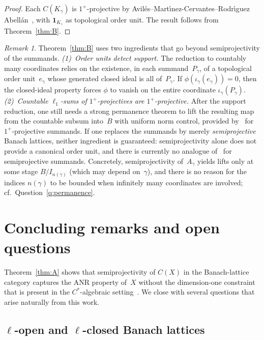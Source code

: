 \documentclass[11pt]{amsart}
\numberwithin{equation}{section}
\theoremstyle{definition}
\theoremstyle{remark}
\newtheorem{remark}[theorem]{Remark}
\theoremstyle{plain}
\begin{document}
\begin{proof}
Each $C(K_\gamma)$ is $1^+$-projective by
Avil\'es--Mart\'{\i}nez-Cervantes--Rodr\'{\i}guez Abell\'an~\cite[Theorem~1.4]{avilaes2020},
with $\mathbf{1}_{K_\gamma}$ as topological order unit.
The result follows from Theorem~\ref{thm:B}.
\end{proof}

\begin{remark}\label{rem:l1-sum-why-special}
Theorem~\ref{thm:B} uses two ingredients that go beyond semiprojectivity
of the summands.
\emph{(1)~Order units detect support.}
The reduction to countably many coordinates relies on the existence, in each summand~$P_\gamma$,
of a topological order unit~$e_\gamma$ whose generated closed ideal is all of~$P_\gamma$.
If $\phi(\iota_\gamma(e_\gamma))=0$, then the closed-ideal property forces
$\phi$ to vanish on the entire coordinate $\iota_\gamma(P_\gamma)$.
\emph{(2)~Countable $\ell_1$-sums of $1^+$-projectives are $1^+$-projective.}
After the support reduction, one still needs a strong permanence theorem to lift the
resulting map from the countable subsum into~$B$ with uniform norm control,
provided by~\cite[Theorem~11.8]{dpw} for $1^+$-projective summands.
If one replaces the summands by merely \emph{semiprojective} Banach lattices,
neither ingredient is guaranteed:
semiprojectivity alone does not provide a canonical order unit,
and there is currently no analogue of~\cite[Theorem~11.8]{dpw} for semiprojective summands.
Concretely, semiprojectivity of~$A_\gamma$ yields lifts only at some stage $B/I_{n(\gamma)}$
(which may depend on~$\gamma$), and there is no reason for the indices $n(\gamma)$ to be
bounded when infinitely many coordinates are involved;
cf.\ Question~\ref{q:permanence}.
\end{remark}

\section{Concluding remarks and open questions}\label{sec:questions}

Theorem~\ref{thm:A} shows that semiprojectivity of $C(X)$ in the Banach-lattice category
captures the ANR property of~$X$ without the dimension-one constraint
that is present in the $C^*$-algebraic setting~\cite{sorensen-thiel}.
We close with several questions that arise naturally from this work.

\subsection*{$\ell$-open and $\ell$-closed Banach lattices}
\end{document}
